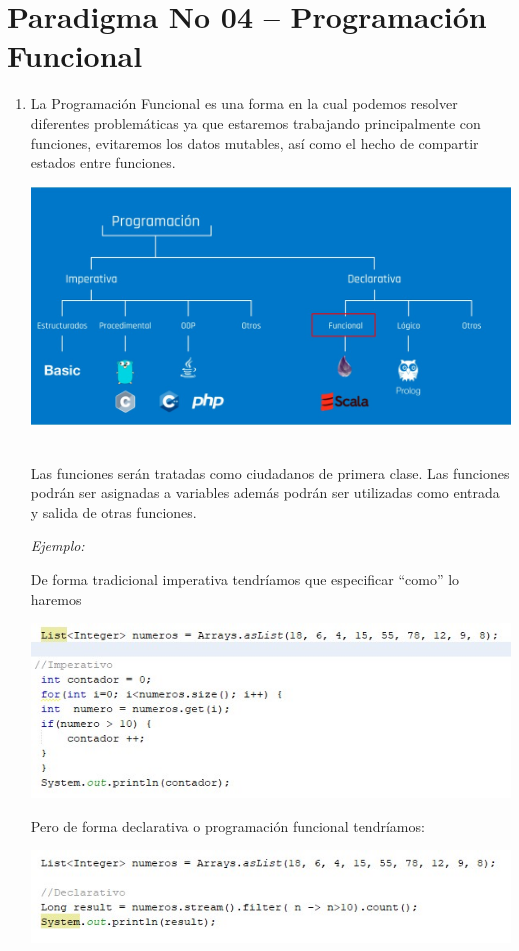 \section{Paradigma No 04 – Programación Funcional} 

\begin{enumerate}[1.]
	\item La Programación Funcional  es una forma en la cual podemos resolver diferentes problemáticas ya que estaremos trabajando principalmente con funciones, evitaremos los datos mutables, así como el hecho de compartir estados entre funciones.
	
\begin{center}
\includegraphics[width=14cm]{./Imagenes/img04} 
\end{center}

	\\Las funciones serán tratadas como ciudadanos de primera clase. Las funciones podrán ser asignadas a variables además podrán ser utilizadas como entrada y salida de otras funciones.
	
\emph{Ejemplo:}

De forma tradicional imperativa tendríamos que especificar “como” lo haremos
\begin{center}
\includegraphics[width=14cm]{./Imagenes/img05} 
\end{center}

Pero de forma declarativa o programación funcional tendríamos: 

\begin{center}
\includegraphics[width=14cm]{./Imagenes/img06} 
\end{center}
 
\end{enumerate}

